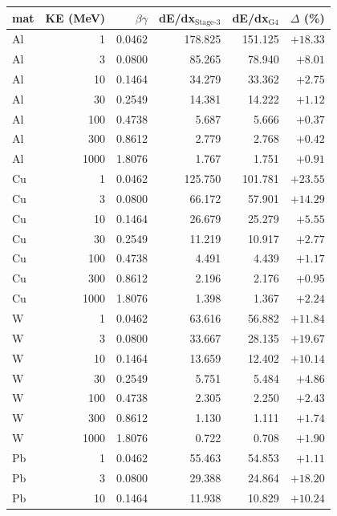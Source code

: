 \begin{table}[h]
\centering
\scriptsize
\setlength{\tabcolsep}{4pt}
\begin{tabular}{@{}l r r r r r@{}}
\toprule
mat & KE (MeV) & $\beta\gamma$ & dE/dx$_{\text{Stage-3}}$ & dE/dx$_{\text{G4}}$ & $\Delta$ (\%) \\
\midrule
Al & 1    & 0.0462 & 178.825 & 151.125 & $+18.33$ \\
Al & 3    & 0.0800 & 85.265  & 78.940  & $+8.01$  \\
Al & 10   & 0.1464 & 34.279  & 33.362  & $+2.75$  \\
Al & 30   & 0.2549 & 14.381  & 14.222  & $+1.12$  \\
Al & 100  & 0.4738 & 5.687   & 5.666   & $+0.37$  \\
Al & 300  & 0.8612 & 2.779   & 2.768   & $+0.42$  \\
Al & 1000 & 1.8076 & 1.767   & 1.751   & $+0.91$  \\
\midrule
Cu & 1    & 0.0462 & 125.750 & 101.781 & $\mathbf{+23.55}$ \\
Cu & 3    & 0.0800 & 66.172  & 57.901  & $+14.29$ \\
Cu & 10   & 0.1464 & 26.679  & 25.279  & $+5.55$  \\
Cu & 30   & 0.2549 & 11.219  & 10.917  & $+2.77$  \\
Cu & 100  & 0.4738 & 4.491   & 4.439   & $+1.17$  \\
Cu & 300  & 0.8612 & 2.196   & 2.176   & $+0.95$  \\
Cu & 1000 & 1.8076 & 1.398   & 1.367   & $+2.24$  \\
\midrule
W  & 1    & 0.0462 & 63.616  & 56.882  & $+11.84$ \\
W  & 3    & 0.0800 & 33.667  & 28.135  & $+19.67$ \\
W  & 10   & 0.1464 & 13.659  & 12.402  & $+10.14$ \\
W  & 30   & 0.2549 & 5.751   & 5.484   & $+4.86$  \\
W  & 100  & 0.4738 & 2.305   & 2.250   & $+2.43$  \\
W  & 300  & 0.8612 & 1.130   & 1.111   & $+1.74$  \\
W  & 1000 & 1.8076 & 0.722   & 0.708   & $+1.90$  \\
\midrule
Pb & 1    & 0.0462 & 55.463  & 54.853  & $+1.11$  \\
Pb & 3    & 0.0800 & 29.388  & 24.864  & $+18.20$ \\
Pb & 10   & 0.1464 & 11.938  & 10.829  & $+10.24$ \\

\end{tabular}
\end{table}
